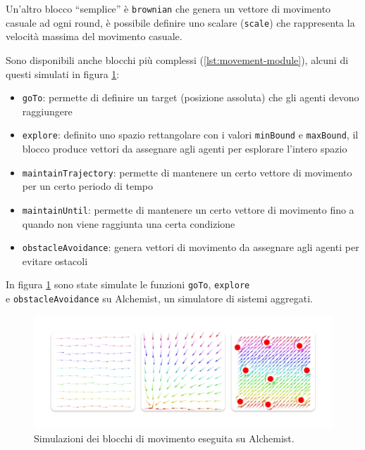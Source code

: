 \documentclass[12pt,a4paper,openright,twoside]{book}
\begin{document}
Un'altro blocco ``semplice'' è \verb|brownian| che genera un vettore di movimento casuale ad ogni round, è possibile definire uno scalare (\verb|scale|) che rappresenta la velocità massima del movimento casuale.

Sono disponibili anche blocchi più complessi (\cref{lst:movement-module}), alcuni di questi simulati in figura \cref{fig:movement-simulations}:
\begin{itemize}
    \item \verb|goTo|: permette di definire un target (posizione assoluta) che gli agenti devono raggiungere
    \item \verb|explore|: definito uno spazio rettangolare con i valori \verb|minBound| e \verb|maxBound|, il blocco produce vettori da assegnare agli agenti per esplorare l'intero spazio
    \item \verb|maintainTrajectory|: permette di mantenere un certo vettore di movimento per un certo periodo di tempo
    \item \verb|maintainUntil|: permette di mantenere un certo vettore di movimento fino a quando non viene raggiunta una certa condizione
    \item \verb|obstacleAvoidance|: genera vettori di movimento da assegnare agli agenti per evitare ostacoli
\end{itemize}

In figura \cref{fig:movement-simulations} \cite{Macroswarm} sono state simulate le funzioni \verb|goTo|, \verb|explore| \\ e \verb|obstacleAvoidance| su Alchemist, un simulatore di sistemi aggregati.

\begin{figure}
    \centering
    \includegraphics[width=.9\linewidth]{figures/movement-simulations.pdf}
    \caption{Simulazioni dei blocchi di movimento eseguita su Alchemist.}
    \label{fig:movement-simulations}
\end{figure}
\end{document}
